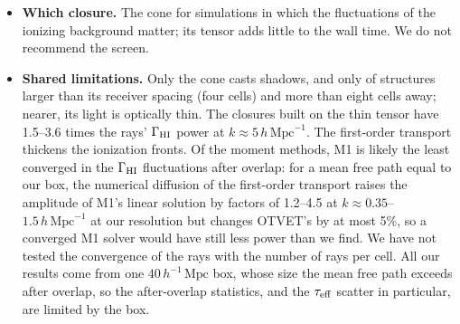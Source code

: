 \documentclass[iop]{openjournal}
\newcommand{\hmpc}{\,h\,\mathrm{Mpc}^{-1}}
\newcommand{\mpch}{\,h^{-1}\,\mathrm{Mpc}}
\begin{document}
\begin{itemize}
\item \textbf{Which closure.} The cone for simulations in which the fluctuations of the ionizing background matter; its tensor adds little to the wall time. We do not recommend the screen.
\item \textbf{Shared limitations.} Only the cone casts shadows, and only of structures larger than its receiver spacing (four cells) and more than eight cells away; nearer, its light is optically thin. The closures built on the thin tensor have 1.5--3.6 times the rays' $\Gamma_{\rm HI}$ power at $k\approx5\hmpc$. The first-order transport thickens the ionization fronts. Of the moment methods, M1 is likely the least converged in the $\Gamma_{\rm HI}$ fluctuations after overlap: for a mean free path equal to our box, the numerical diffusion of the first-order transport raises the amplitude of M1's linear solution by factors of 1.2--4.5 at $k\approx0.35$--$1.5\hmpc$ at our resolution but changes OTVET's by at most 5\%, so a converged M1 solver would have still less power than we find. We have not tested the convergence of the rays with the number of rays per cell. All our results come from one $40\mpch$ box, whose size the mean free path exceeds after overlap, so the after-overlap statistics, and the $\tau_{\rm eff}$ scatter in particular, are limited by the box.

\end{itemize}
\end{document}
